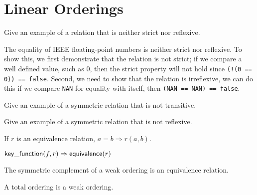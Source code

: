 \chapter{Linear Orderings}

\begin{exercise}
	Give an example of a relation that is neither strict nor reflexive.
\end{exercise}

\begin{solution}
	The equality of IEEE floating-point numbers is neither strict nor reflexive. To show this, we first
	demonstrate that the relation is not strict; if we compare a well defined value, such as 0, then
	the strict property will not hold since \verb|(!(0 == 0)) == false|. Second, we need to show that
	the relation is irreflexive, we can do this if we compare \verb|NAN| for equality with itself, then
	\verb|(NAN == NAN) == false|.

	
\end{solution}

\begin{exercise}
	Give an example of a symmetric relation that is not transitive.
\end{exercise}

\begin{exercise}
	Give an example of a symmetric relation that is not reflexive.
\end{exercise}

\begin{lemma}
	If $r$ is an equivalence relation, $a = b \Rightarrow r(a, b)$.
\end{lemma}

\begin{lemma}
	$\mathsf{key\_function}(f, r) \Rightarrow \mathsf{equivalence}(r)$
\end{lemma}

\begin{lemma}
	The symmetric complement of a weak ordering is an equivalence relation.
\end{lemma}

\begin{lemma}
	A total ordering is a weak ordering.
\end{lemma}
